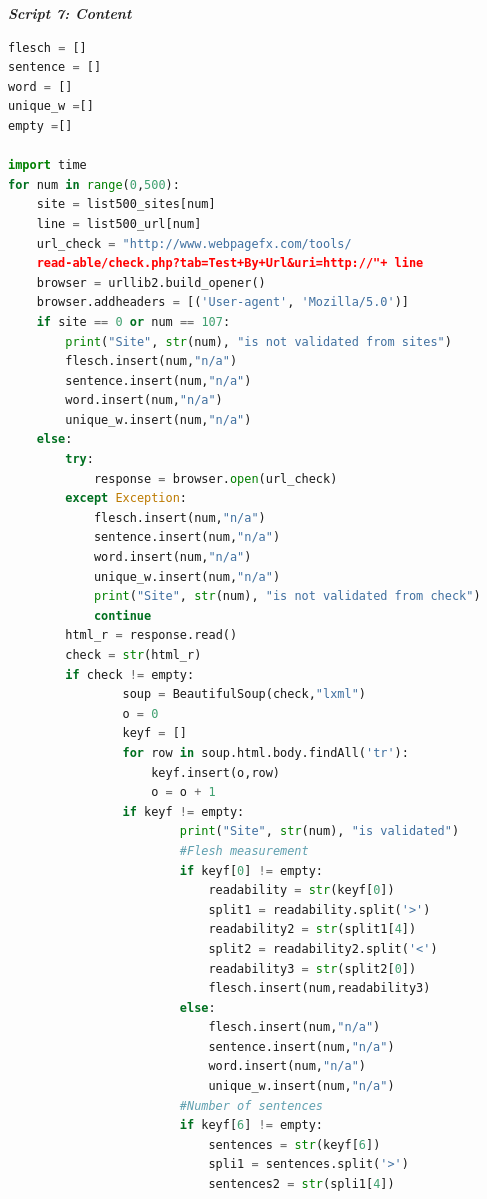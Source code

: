 \documentclass{article}
\begin{document}
\begin{center}
\textit{\textbf{Script 7: Content}}\label{p7}
\end{center}
\begin{lstlisting}[language=Python]
flesch = []
sentence = []
word = []
unique_w =[]
empty =[]

import time 
for num in range(0,500):
    site = list500_sites[num]
    line = list500_url[num] 
    url_check = "http://www.webpagefx.com/tools/
    read-able/check.php?tab=Test+By+Url&uri=http://"+ line
    browser = urllib2.build_opener()
    browser.addheaders = [('User-agent', 'Mozilla/5.0')]
    if site == 0 or num == 107:
        print("Site", str(num), "is not validated from sites")
        flesch.insert(num,"n/a")
        sentence.insert(num,"n/a")
        word.insert(num,"n/a")
        unique_w.insert(num,"n/a")  
    else:
        try:
            response = browser.open(url_check)
        except Exception: 
            flesch.insert(num,"n/a")
            sentence.insert(num,"n/a")
            word.insert(num,"n/a")
            unique_w.insert(num,"n/a")
            print("Site", str(num), "is not validated from check")
            continue        
        html_r = response.read()
        check = str(html_r)       
        if check != empty:                
                soup = BeautifulSoup(check,"lxml")
                o = 0
                keyf = []
                for row in soup.html.body.findAll('tr'):
                    keyf.insert(o,row)
                    o = o + 1
                if keyf != empty:                        
                        print("Site", str(num), "is validated")
                        #Flesh measurement
                        if keyf[0] != empty:
                            readability = str(keyf[0])
                            split1 = readability.split('>')
                            readability2 = str(split1[4])
                            split2 = readability2.split('<')
                            readability3 = str(split2[0])
                            flesch.insert(num,readability3)
                        else:
                            flesch.insert(num,"n/a")
                            sentence.insert(num,"n/a")
                            word.insert(num,"n/a")
                            unique_w.insert(num,"n/a")   
                        #Number of sentences   
                        if keyf[6] != empty:
                            sentences = str(keyf[6])
                            spli1 = sentences.split('>')
                            sentences2 = str(spli1[4])

\end{lstlisting}
\end{document}

